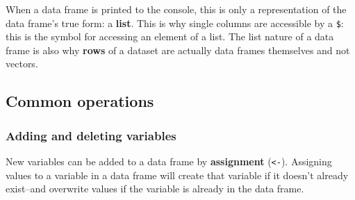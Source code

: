 \documentclass[
  13,
  letterpaper,
]{report}
\begin{document}
When a data frame is printed to the console, this is only a
representation of the data frame's true form: a \textbf{list}. This is
why single columns are accessible by a \texttt{\$}: this is the symbol
for accessing an element of a list. The list nature of a data frame is
also why \textbf{rows} of a dataset are actually data frames themselves
and not vectors.

\subsection{Common operations}\label{sec-05-df-com}

\subsubsection{Adding and deleting variables}\label{sec-05-df-com-vars}

New variables can be added to a data frame by \textbf{assignment}
(\texttt{\textless{}-}). Assigning values to a variable in a data frame
will create that variable if it doesn't already exist--and overwrite
values if the variable is already in the data frame.
\end{document}
